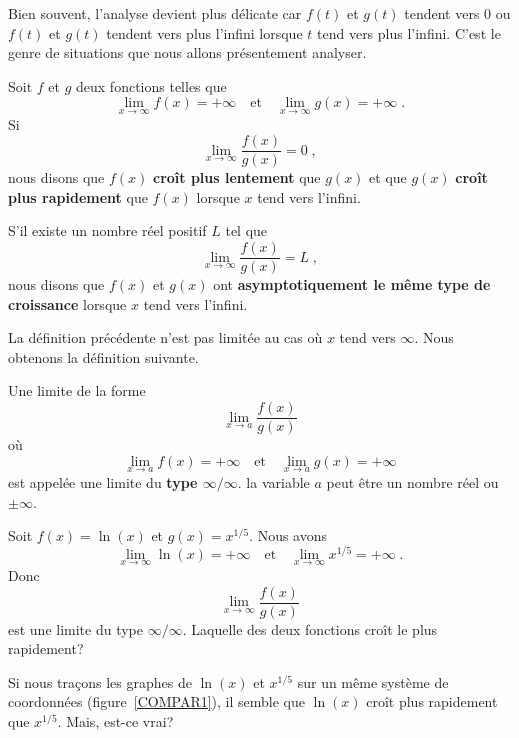 {Bien souvent, l'analyse devient plus délicate car $f(t)$ et $g(t)$
tendent vers $0$ ou $f(t)$ et $g(t)$ tendent vers plus l'infini
lorsque $t$ tend vers plus l'infini.  C'est le genre de situations que
nous allons présentement analyser.

\begin{defn} 
Soit $f$ et $g$ deux fonctions telles que
\[
\lim_{x\rightarrow \infty} f(x) = +\infty \quad \text{et} \quad
\lim_{x\rightarrow \infty} g(x) = +\infty \; .
\]
Si
\[
\lim_{x \rightarrow \infty} \frac{f(x)}{g(x)} = 0 \; ,
\]
nous disons que $f(x)$ {\bfseries croît plus lentement} que $g(x)$ et que
$g(x)$ {\bfseries croît plus rapidement} que $f(x)$ lorsque $x$ tend
vers l'infini.

S'il existe un nombre réel positif $L$ tel que
\[
\lim_{x \rightarrow \infty} \frac{f(x)}{g(x)} = L \; ,
\]
nous disons que $f(x)$ et $g(x)$ ont
{\bfseries asymptotiquement le même type de croissance} lorsque $x$
tend vers l'infini.
\label{DAasymptinfty}
\end{defn}

La définition précédente n'est pas limitée au cas où $x$ tend vers
$\infty$.  Nous obtenons la définition suivante.

\begin{defn}
Une limite de la forme
\[
\lim_{x \rightarrow a} \frac{f(x)}{g(x)}
\]
où
\[
\lim_{x\rightarrow a} f(x) = +\infty \quad \text{et} \quad
\lim_{x\rightarrow a} g(x) = +\infty
\]
est appelée une limite du {\bfseries type $\infty/\infty$}.  la
variable $a$ peut être un nombre réel ou $\pm \infty$.
\end{defn}

\begin{egg}
Soit $f(x) = \ln(x)$ et $g(x)=x^{1/5}$.  Nous avons
\[
\lim_{x\rightarrow \infty} \ln(x) = +\infty \quad \text{et} \quad
\lim_{x\rightarrow \infty} x^{1/5} = +\infty \; .
\]
Donc
\[
\lim_{x \rightarrow \infty} \frac{f(x)}{g(x)}
\]
est une limite du type $\infty/\infty$.  Laquelle des deux fonctions
croît le plus rapidement?

Si nous traçons les graphes de $\ln(x)$ et $x^{1/5}$ sur un même système
de coordonnées (figure~\ref{COMPAR1}), il semble que $\ln(x)$
croît plus rapidement que $x^{1/5}$.  Mais, est-ce vrai?


\end{egg}}
